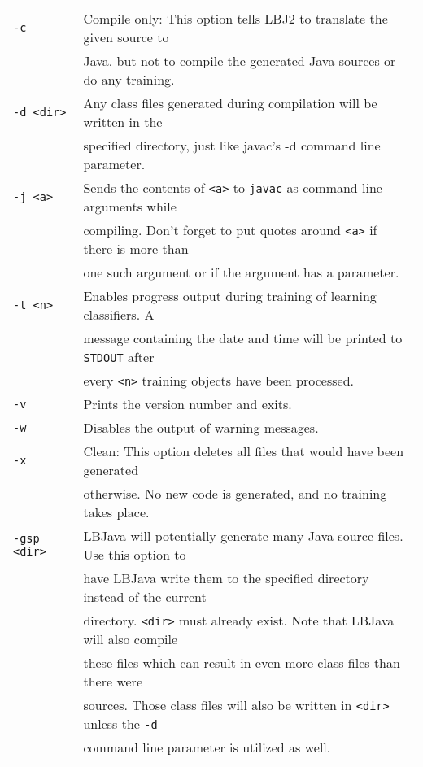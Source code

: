 \begin{center}
\begin{tabular}{ll}
{\tt -c} &
Compile only: This option tells LBJ2 to translate the given source to \\
& Java, but not to compile the generated Java sources or do any training.
\vspace{.2cm} \\

{\tt -d <dir>} &
Any class files generated during compilation will be written in the \\
& specified directory, just like javac's -d command line parameter.
\vspace{.2cm} \\

{\tt -j <a>} &
Sends the contents of {\tt <a>} to {\tt javac} as command line arguments while
\\
& compiling.  Don't forget to put quotes around {\tt <a>} if there is more
than \\
& one such argument or if the argument has a parameter. \vspace{.2cm} \\

{\tt -t <n>} &
Enables progress output during training of learning classifiers.  A \\
& message containing the date and time will be printed to {\tt STDOUT} after
\\
& every {\tt <n>} training objects have been processed. \vspace{.2cm} \\

{\tt -v} &
Prints the version number and exits. \vspace{.2cm} \\

{\tt -w} &
Disables the output of warning messages. \vspace{.2cm} \\

{\tt -x} &
Clean: This option deletes all files that would have been generated \\
& otherwise.  No new code is generated, and no training takes place.
\vspace{.2cm} \\

{\tt -gsp <dir>} &
LBJava will potentially generate many Java source files.  Use this option to \\
& have LBJava write them to the specified directory instead of the current \\
& directory.  {\tt <dir>} must already exist.  Note that LBJava will also compile
\\
& these files which can result in even more class files than there were \\
& sources.  Those class files will also be written in {\tt <dir>} unless the
{\tt -d} \\
& command line parameter is utilized as well. \vspace{.2cm} \\


\end{tabular}
\end{center}
